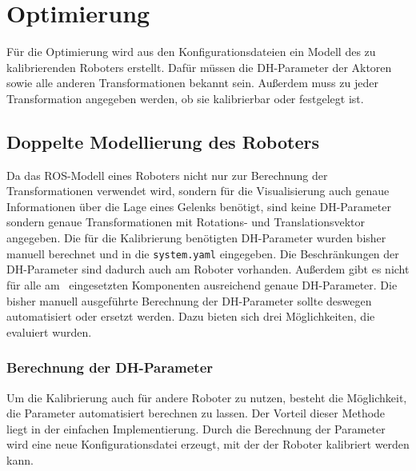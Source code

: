 

\section{Optimierung} %

\label{sec:Optimierung}

Für die Optimierung wird aus den Konfigurationsdateien ein Modell des zu 
kalibrierenden Roboters erstellt. Dafür müssen die \ac{DH-Parameter} der Aktoren
sowie alle anderen Transformationen bekannt sein. Außerdem muss zu jeder Transformation 
angegeben werden, ob sie kalibrierbar oder festgelegt ist.

\subsection{Doppelte Modellierung des Roboters} %
\label{sub:doppelte modellierung}


Da das \ac{ROS}-Modell eines 
Roboters nicht nur zur Berechnung der Transformationen verwendet wird, sondern für die Visualisierung auch genaue
Informationen über die Lage eines Gelenks benötigt, sind keine \ac{DH-Parameter} sondern
genaue Transformationen mit Rotations- und Translationsvektor angegeben. Die für die
Kalibrierung benötigten \ac{DH-Parameter} wurden bisher manuell berechnet und
in die \texttt{system.yaml} eingegeben. Die Beschränkungen der \ac{DH-Parameter}
sind dadurch auch am Roboter vorhanden. Außerdem gibt es nicht für alle am \cob\ 
eingesetzten Komponenten ausreichend genaue \ac{DH-Parameter}. Die bisher manuell
ausgeführte Berechnung der \ac{DH-Parameter} sollte deswegen automatisiert oder
ersetzt werden. Dazu bieten sich drei Möglichkeiten, die evaluiert wurden. 




\subsubsection{Berechnung der \ac{DH-Parameter}} %

\label{ssub:Berechnung der dh-par}

Um die Kalibrierung auch für andere Roboter zu nutzen,
besteht die Möglichkeit, die Parameter automatisiert berechnen zu lassen. Der Vorteil
dieser Methode liegt in der einfachen Implementierung. Durch die Berechnung der Parameter 
wird eine neue Konfigurationsdatei erzeugt, mit der der Roboter kalibriert werden kann.

